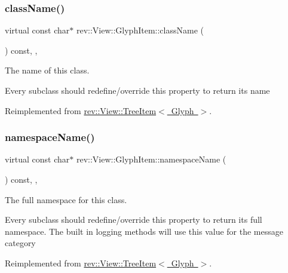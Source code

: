 \subsubsection{\texorpdfstring{className()}{className()}}
{\footnotesize\ttfamily virtual const char$\ast$ rev\+::\+View\+::\+Glyph\+Item\+::class\+Name (\begin{DoxyParamCaption}{ }\end{DoxyParamCaption}) const\hspace{0.3cm}{\ttfamily [inline]}, {\ttfamily [override]}, {\ttfamily [virtual]}}



The name of this class. 

Every subclass should redefine/override this property to return its name 

Reimplemented from \mbox{\hyperlink{classrev_1_1_view_1_1_tree_item_a8a12a6ceece6cab7a2299da2b5e6a54b}{rev\+::\+View\+::\+Tree\+Item$<$ Glyph $>$}}.

\mbox{\label{classrev_1_1_view_1_1_glyph_item_a8fa3b57d04a71e8d5f9eb7593c7d2f0f}} 
\subsubsection{\texorpdfstring{namespaceName()}{namespaceName()}}
{\footnotesize\ttfamily virtual const char$\ast$ rev\+::\+View\+::\+Glyph\+Item\+::namespace\+Name (\begin{DoxyParamCaption}{ }\end{DoxyParamCaption}) const\hspace{0.3cm}{\ttfamily [inline]}, {\ttfamily [override]}, {\ttfamily [virtual]}}



The full namespace for this class. 

Every subclass should redefine/override this property to return its full namespace. The built in logging methods will use this value for the message category 

Reimplemented from \mbox{\hyperlink{classrev_1_1_view_1_1_tree_item_a3bb552a87176f4b12848e43dfdd287b2}{rev\+::\+View\+::\+Tree\+Item$<$ Glyph $>$}}.

\mbox{\label{classrev_1_1_view_1_1_glyph_item_a0afc24f14c725056ad457f43881ea279}} 
